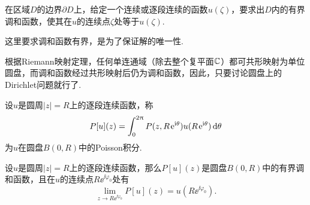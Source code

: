 在区域$D$的边界$\partial D$上，给定一个连续或逐段连续的函数$u(\zeta)$，要求出$D$内的有界调和函数，使其在$u$的连续点$\zeta$处等于$u(\zeta)$.

这里要求调和函数有界，是为了保证解的唯一性.

根据Riemann映射定理，任何单连通域（除去整个复平面$\mathbb C$）都可共形映射为单位圆盘，而调和函数经过共形映射后仍为调和函数，因此，只要讨论圆盘上的Dirichlet问题就行了.

设$u$是圆周$|z|=R$上的逐段连续函数，称
\begin{equation}\label{eq8.2.1}
  P[u](z) = \int_0^{2\uppi}P(z,R\operatorname{\!\!\;\mathrm e}^{\mathrm i\theta})u(R\operatorname{\!\!\;\mathrm e}^{\mathrm i\theta})\mathop{}\!\mathrm{d} \theta
\end{equation}
为$u$在圆盘$B(0,R)$中的Poisson积分.
\begin{theorem}\label{thm8.2.1}
  设$u$是圆周$|z|=R$上的逐段连续函数，那么$P[u](z)$是圆盘$B(0,R)$中的有界调和函数，且在$u$的连续点$R\ee^{\ii\varphi_0}$处有
  \begin{equation}\label{eq8.2.2}
    \lim_{z\to R\ee^{\ii\varphi_0}}P[u](z) = u(R\ee^{\ii\varphi_0}).
  \end{equation}
\end{theorem}
